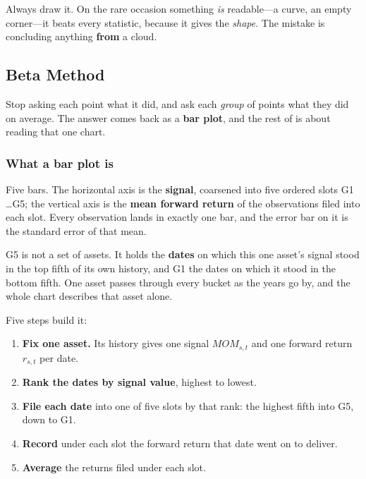 \begin{note}
Always draw it. On the rare occasion something \emph{is} readable---a curve, an empty corner---it
beats every statistic, because it gives the \emph{shape}. The mistake is concluding anything
\textbf{from} a cloud.
\end{note}

\subsection{Beta Method}\label{sec:beta-method}

Stop asking each point what it did, and ask each \emph{group} of points what they did on average.
The answer comes back as a \textbf{bar plot}, and the rest of  is about
reading that one chart.

\subsubsection{What a bar plot is}\label{sec:bar-plot}

\begin{definition}\label{def:bar-plot}
Five bars. The horizontal axis is the \textbf{signal}, coarsened into five ordered slots
G1 \ldots G5; the vertical axis is the \textbf{mean forward return} of the observations filed into
each slot. Every observation lands in exactly one bar, and the error bar on it is the standard error
of that mean.
\end{definition}

\begin{note}
G5 is not a set of assets. It holds the \textbf{dates} on which this one asset's signal stood in the
top fifth of its own history, and G1 the dates on which it stood in the bottom fifth. One asset
passes through every bucket as the years go by, and the whole chart describes that asset alone.
\end{note}

Five steps build it:

\begin{enumerate}
  \item \textbf{Fix one asset.} Its history gives one signal $\mathit{MOM}_{s,t}$ and one forward
        return $r_{s,t}$ per date.
  \item \textbf{Rank the dates by signal value}, highest to lowest.
  \item \textbf{File each date} into one of five slots by that rank: the highest fifth into G5, down
        to G1.
  \item \textbf{Record} under each slot the forward return that date went on to deliver.
  \item \textbf{Average} the returns filed under each slot.
\end{enumerate}

